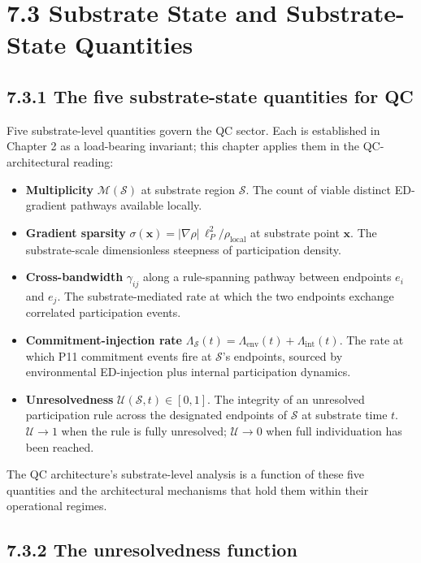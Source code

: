 \documentclass[11pt]{book}
\begin{document}
\section{7.3 Substrate State and Substrate-State Quantities}

\subsection{7.3.1 The five substrate-state quantities for QC}

Five substrate-level quantities govern the QC sector. Each is established in Chapter 2 as a load-bearing invariant; this chapter applies them in the QC-architectural reading:

\begin{itemize}
\item \textbf{Multiplicity} $\mathcal{M}(\mathcal{S})$ at substrate region $\mathcal{S}$. The count of viable distinct ED-gradient pathways available locally.
\item \textbf{Gradient sparsity} $\sigma(\mathbf{x}) = |\nabla\rho|\,\ell_P^2/\rho_\mathrm{local}$ at substrate point $\mathbf{x}$. The substrate-scale dimensionless steepness of participation density.
\item \textbf{Cross-bandwidth} $\gamma_{ij}$ along a rule-spanning pathway between endpoints $e_i$ and $e_j$. The substrate-mediated rate at which the two endpoints exchange correlated participation events.
\item \textbf{Commitment-injection rate} $\Lambda_\mathcal{S}(t) = \Lambda_\mathrm{env}(t) + \Lambda_\mathrm{int}(t)$. The rate at which P11 commitment events fire at $\mathcal{S}$'s endpoints, sourced by environmental ED-injection plus internal participation dynamics.
\item \textbf{Unresolvedness} $\mathcal{U}(\mathcal{S}, t) \in [0, 1]$. The integrity of an unresolved participation rule across the designated endpoints of $\mathcal{S}$ at substrate time $t$. $\mathcal{U} \to 1$ when the rule is fully unresolved; $\mathcal{U} \to 0$ when full individuation has been reached.
\end{itemize}

The QC architecture's substrate-level analysis is a function of these five quantities and the architectural mechanisms that hold them within their operational regimes.

\subsection{7.3.2 The unresolvedness function}
\end{document}
